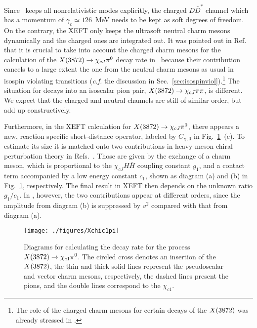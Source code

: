    Since \nreft~keeps all nonrelativistic modes explicitly, the charged
  $D\bar D^*$ channel which has a momentum of $\gamma_c\simeq126$~MeV needs to
  be kept as soft degrees of freedom. On the contrary, the XEFT only keeps the
  ultrasoft neutral charm mesons dynamically and the charged ones are integrated
  out.
  It was pointed out in Ref.~\cite{Mehen:2015efa} that it is crucial to take
  into account the charged charm mesons for the calculation of the
  $X(3872)\to\chi_{cJ}\pi^0$ decay rate in \nreft~because their contribution
cancels to a large extent the one
  from the neutral charm mesons as usual in isospin violating transitions
({\sl c.f.}
the discussion in Sec.~\ref{sec:isospinviol}).\footnote{The role of the
charged
 charm mesons for certain decays of the $X(3872)$ was already stressed in
 \cite{Gamermann:2009fv}.}
  The situation for decays into an isoscalar pion pair, $X(3872)\to\chi_{cJ}\pi\pi$,
  is different. We expect that the charged and neutral channels are still of
  similar order, but add up constructively.
  
  Furthermore, in the XEFT calculation for  $X(3872)\to\chi_{cJ}\pi^0$, there appears a new,
  reaction specific
  short-distance operator, labeled by $C_{\chi,0}$ in
  Fig.~\ref{fig:Xchic1pi}~(c). 
  To estimate its size it is matched onto two contributions in heavy meson
  chiral perturbation theory in Refs.~\cite{Fleming:2008yn,Fleming:2011xa}. Those
  are given by the exchange of a charm meson, which is proportional to the
  $\chi_{cJ}H\bar H$ coupling constant $g_1$, and a contact term accompanied
  by a low energy constant $c_1$, shown as diagram (a)
  and (b) in Fig.~\ref{fig:Xchic1pi}, respectively. The final result in XEFT
  then depends on the unknown ratio $g_1/c_1$. In \nreft, however, the two
  contributions appear at different orders, since the amplitude from diagram (b) is
  suppressed by $v^2$ compared with that from diagram (a).
  
  \begin{figure}[tb]
    \begin{center}
     \texttt{[image: ./figures/Xchic1pi]}\\
     \caption{Diagrams for calculating the decay rate for the process
     $X(3872)\to\chi_{c1}\pi^0$.
     The circled cross denotes an insertion of the $X(3872)$, the thin and thick 
     solid lines represent the pseudoscalar and vector charm mesons, 
     respectively, the dashed lines present the pions, and the double lines
     correspond to the $\chi_{c1}$.
     \label{fig:Xchic1pi}}
    \end{center}
  \end{figure}



